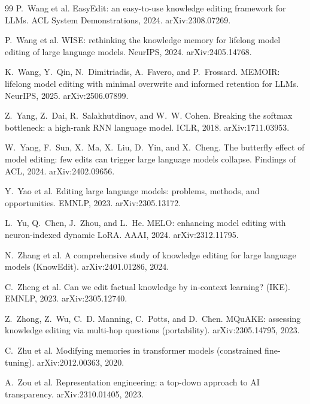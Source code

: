 \documentclass[11pt]{article}
\theoremstyle{remark}
\begin{document}
\begin{thebibliography}{99}
P.~Wang et al.
\newblock EasyEdit: an easy-to-use knowledge editing framework for LLMs.
\newblock ACL System Demonstrations, 2024. arXiv:2308.07269.

P.~Wang et al.
\newblock WISE: rethinking the knowledge memory for lifelong model editing of large language models.
\newblock NeurIPS, 2024. arXiv:2405.14768.

K.~Wang, Y.~Qin, N.~Dimitriadis, A.~Favero, and P.~Frossard.
\newblock MEMOIR: lifelong model editing with minimal overwrite and informed retention for LLMs.
\newblock NeurIPS, 2025. arXiv:2506.07899.

Z.~Yang, Z.~Dai, R.~Salakhutdinov, and W.~W. Cohen.
\newblock Breaking the softmax bottleneck: a high-rank RNN language model.
\newblock ICLR, 2018. arXiv:1711.03953.

W.~Yang, F.~Sun, X.~Ma, X.~Liu, D.~Yin, and X.~Cheng.
\newblock The butterfly effect of model editing: few edits can trigger large language models collapse.
\newblock Findings of ACL, 2024. arXiv:2402.09656.

Y.~Yao et al.
\newblock Editing large language models: problems, methods, and opportunities.
\newblock EMNLP, 2023. arXiv:2305.13172.

L.~Yu, Q.~Chen, J.~Zhou, and L.~He.
\newblock MELO: enhancing model editing with neuron-indexed dynamic LoRA.
\newblock AAAI, 2024. arXiv:2312.11795.

N.~Zhang et al.
\newblock A comprehensive study of knowledge editing for large language models (KnowEdit).
\newblock arXiv:2401.01286, 2024.

C.~Zheng et al.
\newblock Can we edit factual knowledge by in-context learning? (IKE).
\newblock EMNLP, 2023. arXiv:2305.12740.

Z.~Zhong, Z.~Wu, C.~D. Manning, C.~Potts, and D.~Chen.
\newblock MQuAKE: assessing knowledge editing via multi-hop questions (portability).
\newblock arXiv:2305.14795, 2023.

C.~Zhu et al.
\newblock Modifying memories in transformer models (constrained fine-tuning).
\newblock arXiv:2012.00363, 2020.

A.~Zou et al.
\newblock Representation engineering: a top-down approach to AI transparency.
\newblock arXiv:2310.01405, 2023.
\end{thebibliography}
\end{document}
